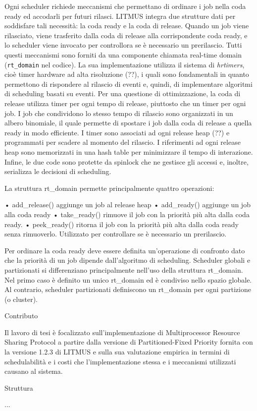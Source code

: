 Ogni scheduler richiede meccanismi che permettano di ordinare i job nella coda ready ed accodarli per futuri rilasci. LITMUS integra due strutture dati per soddisfare tali necessità: la coda ready e la coda di release. Quando un job viene rilasciato, viene trasferito dalla coda di release alla corrispondente coda ready, e lo scheduler viene invocato per controllora se è necessario un prerilascio. Tutti questi meccanismi sono forniti da una componente chiamata real-time domain (\texttt{rt\_domain} nel codice). La sua implementazione utilizza il sistema di \textit{hrtimers}, cioè timer hardware ad alta risoluzione (??), i quali sono fondamentali in quanto permettono di rispondere al rilascio di eventi e, quindi, di implementare algoritmi di scheduling basati su eventi.
Per una questione di ottimizzazione, la coda di release utilizza timer per ogni tempo di release, piuttosto che un timer per ogni job. I job che condividono lo stesso tempo di rilascio sono organizzati in un albero binomiale, il quale permette di spostare i job dalla coda di release a quella ready in modo efficiente. I timer sono associati ad ogni release heap (??) e programmati per scadere al momento del rilascio. I riferimenti ad ogni release heap sono memorizzati in una hash table per minimizzare il tempo di interazione. Infine, le due code sono protette da spinlock che ne gestisce gli accessi e, inoltre, serializza le decisioni di scheduling.

La struttura rt\_domain permette principalmente quattro operazioni:

• add\_release() aggiunge un job al release heap
• add\_ready() aggiunge un job alla coda ready
• take\_ready() rimuove il job con la priorità più alta dalla coda ready. 
• peek\_ready() ritorna il job con la priorità più alta dalla coda ready senza rimuoverlo. Utilizzato per controllare se è necessario un prerilascio.

Per ordinare la coda ready deve essere definita un'operazione di confronto dato che la priorità di un job dipende dall'algoritmo di scheduling.
Scheduler globali e partizionati si differenziano principalmente nell'uso della struttura rt\_domain. Nel primo caso è definito un unico rt\_domain ed è condiviso nello spazio globale. Al contrario, scheduler partizionati definiscono un rt\_domain per ogni partizione (o cluster).

Contributo

Il lavoro di tesi è focalizzato sull'implementazione di Multiprocessor Resource Sharing Protocol a partire dalla versione di Partitioned-Fixed Priority fornita con la versione 1.2.3 di LITMUS e sulla sua valutazione empirica in termini di schedulabilità e i costi che l'implementazione stessa e i meccanismi utilizzati causano al sistema.

Struttura

...




